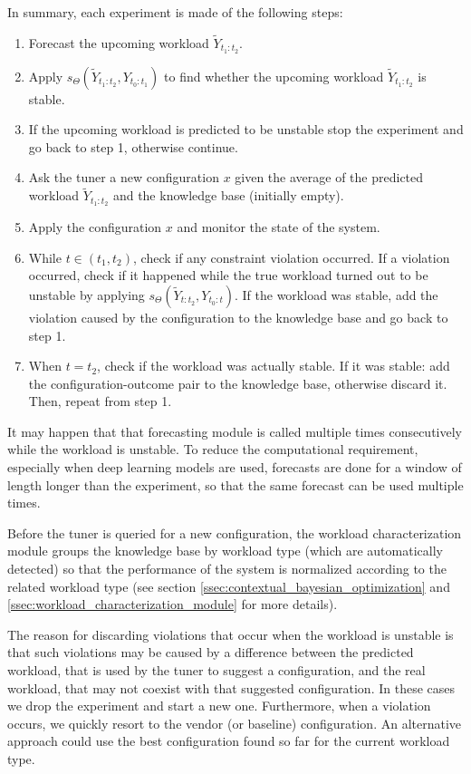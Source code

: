 \documentclass[a4paper]{article} %
\begin{document}
	 In summary, each experiment is made of the following steps: 
	\begin{enumerate}
		\item Forecast the upcoming workload $\tilde{Y}_{t_1:t_2}$.
		\item Apply $s_\Theta(\tilde{Y}_{t_1:t_2}, Y_{t_0:t_1})$ to find whether the upcoming workload $\tilde{Y}_{t_1:t_2}$ is stable.
		\item If the upcoming workload is predicted to be unstable stop the experiment and go back to step 1, otherwise continue.
		\item Ask the tuner a new configuration $x$ given the average of the predicted workload $\tilde{Y}_{t_1:t_2}$ and the knowledge base (initially empty).
		\item Apply the configuration $x$ and monitor the state of the system.
		\item While $t \in (t_1, t_2)$, check if any constraint violation occurred. If a violation occurred, check if it happened while the true workload turned out to be unstable by applying $s_\Theta(\tilde{Y}_{t:t_2}, Y_{t_0:t})$. If the workload was stable, add the violation caused by the configuration to the knowledge base and go back to step 1.
		\item When $t=t_2$, check if the workload was actually stable.  If it was stable: add the configuration-outcome pair to the knowledge base, otherwise discard it.\\
				  Then, repeat from step 1.
	\end{enumerate}
	It may happen that that forecasting module is called multiple times consecutively while the workload is unstable. To reduce the computational requirement, especially when deep learning models are used, forecasts are done for a window of length longer than the experiment, so that the same forecast can be used multiple times.
	
	Before the tuner is queried for a new configuration, the workload characterization module groups the knowledge base by workload type (which are automatically detected) so that the performance of the system is normalized according to the related workload type (see section \ref{ssec:contextual_bayesian_optimization} and \ref{ssec:workload_characterization_module} for more details).
	
	The reason for discarding violations that occur when the workload is unstable is that such violations may be caused by a difference between the predicted workload, that is used by the tuner to suggest a configuration, and the real workload, that may not coexist with that suggested configuration. In these cases we drop the experiment and start a new one. 
	Furthermore, when a violation occurs, we quickly resort to the vendor (or baseline) configuration. An alternative approach could use the best configuration found so far for the current workload type.
	
\end{document}
